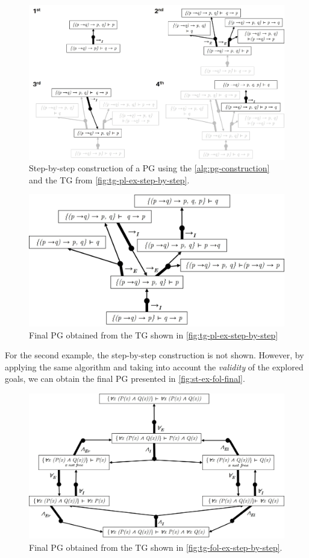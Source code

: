 \begin{figure}[h]
    \centering
    \includegraphics[width=1\linewidth]{Chapters/Figures/sg-gen.jpg}
    \caption{Step-by-step construction of a PG using the \autoref{alg:pg-construction} and the TG from \autoref{fig:tg-pl-ex-step-by-step}. }
    \label{fig:st-ex}
\end{figure}
\vspace{1em}
\begin{figure}[h]
    \centering
    \includegraphics[width=0.8\linewidth]{Chapters/Figures/sg-ex-final.jpg}
    \caption{Final PG obtained from the TG shown in \autoref{fig:tg-pl-ex-step-by-step}}
    \label{fig:st-ex-final}
\end{figure}

For the second example, the step-by-step construction is not shown. However, by applying the same algorithm and taking into account the \emph{validity} of the explored goals, we can obtain the final \gls{PG} presented in \autoref{fig:st-ex-fol-final}.

\begin{figure}[h]
    \centering
    \includegraphics[width=0.8\linewidth]{Chapters/Figures/sg-ex-fol-final.jpg}
    \caption{Final PG obtained from the TG shown in \autoref{fig:tg-fol-ex-step-by-step}.}
    \label{fig:st-ex-fol-final}
\end{figure}

